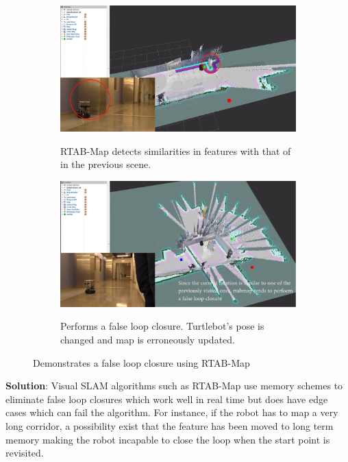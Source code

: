 \begin{figure}
\begin{subfigure}[b]{0.497\textwidth}
		\includegraphics[width=\textwidth, height=0.7\textwidth]{images/loop3.png}
		\label{subfig:c}
		\caption{RTAB-Map detects similarities in features with that of in the previous scene.}
	\end{subfigure}
	\begin{subfigure}[b]{0.497\textwidth}
		\includegraphics[width=\textwidth, height=0.7\textwidth]{images/loop4.png}
		\label{subfig:d}
		\caption{Performs a false loop closure. Turtlebot's pose is changed and map is erroneously updated.}
	\end{subfigure}
\caption{Demonstrates a false loop closure using RTAB-Map}
\end{figure}

\clearpage
\textbf{Solution}:
Visual SLAM algorithms such as RTAB-Map use memory schemes to eliminate false loop closures\cite{22} which work well in real time but does have edge cases which can fail the algorithm. For instance, if the robot has to map a very long corridor, a possibility exist that the feature has been moved to long term memory making the robot incapable to close the loop when the start point is revisited.


